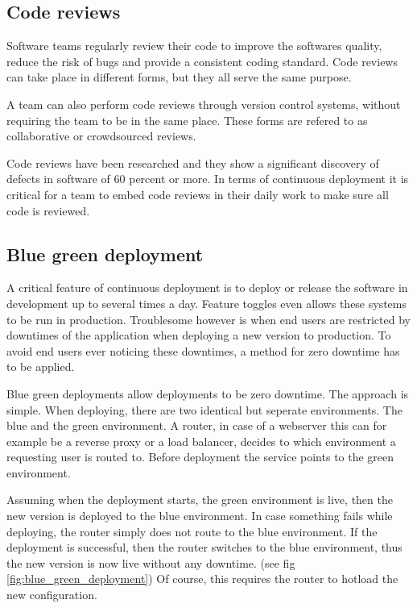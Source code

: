 \subsection{Code reviews}

Software teams regularly review their code to improve the softwares quality,
reduce the risk of bugs and provide a consistent coding standard. Code reviews
can take place in different forms, but they all serve the same purpose.

A team can also perform code reviews through version control systems, without
requiring the team to be in the same place. These forms are refered to as
collaborative or crowdsourced reviews.

Code reviews have been researched and they show a significant discovery of
defects in software of 60 percent or more. In terms of continuous deployment it
is critical for a team to embed code reviews in their daily work to make sure
all code is reviewed.

\subsection{Blue green deployment}

A critical feature of continuous deployment is to deploy or release the
software in development up to several times a day. Feature toggles even allows
these systems to be run in production. Troublesome however is when end users
are restricted by downtimes of the application when deploying a new version to
production. To avoid end users ever noticing these downtimes, a method for zero
downtime has to be applied.

Blue green deployments allow deployments to be zero downtime. The approach is
simple. When deploying, there are two identical but seperate environments. The
blue and the green environment. A router, in case of a webserver this can for
example be a reverse proxy or a load balancer, decides to which environment a
requesting user is routed to. Before deployment the service points to the green
environment.

Assuming when the deployment starts, the green environment is live, then the
new version is deployed to the blue environment. In case something fails while
deploying, the router simply does not route to the blue environment. If the
deployment is successful, then the router switches to the blue environment,
thus the new version is now live without any downtime. (see fig
\ref{fig:blue_green_deployment}) Of course, this requires the router to hotload the
new configuration.

